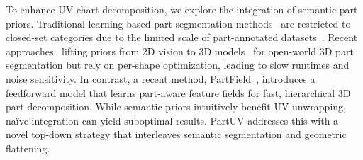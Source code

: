 To enhance UV chart decomposition, we explore the integration of semantic part priors. Traditional learning-based part segmentation methods~\cite{qian2022pointnext,jiang2020pointgroup,vu2022softgroup} are restricted to closed-set categories due to the limited scale of part-annotated datasets~\cite{mo2019partnet,yi2016scalable}. Recent approaches~\cite{yang2023sam3d,xu2023sampro3d,yin2024sai3d,guo2024sam,zhou2018open3d,xu2024embodiedsam,he2024pointseg} lifting priors from 2D vision to 3D models~\cite{kirillov2023segment,li2022grounded} for open-world 3D part segmentation but rely on per-shape optimization, leading to slow runtimes and noise sensitivity. In contrast, a recent method, PartField~\cite{liu2025partfield}, introduces a feedforward model that learns part-aware feature fields for fast, hierarchical 3D part decomposition. While semantic priors intuitively benefit UV unwrapping, naïve integration can yield suboptimal results. PartUV addresses this with a novel top-down strategy that interleaves semantic segmentation and geometric flattening.